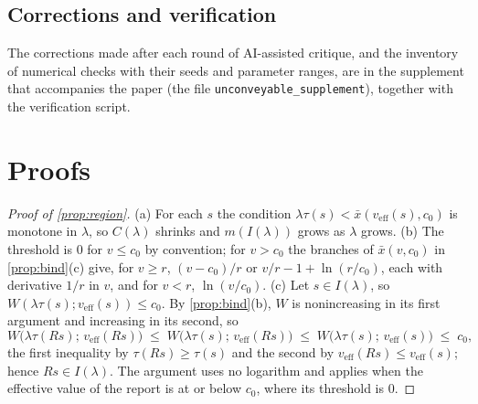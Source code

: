 \subsection{Corrections and verification}

The corrections made after each round of AI-assisted critique, and the inventory of numerical checks with their seeds and parameter ranges, are in the supplement that accompanies the paper (the file \texttt{unconveyable\_supplement}), together with the verification script.

\section{Proofs}\label{app:proofs}

\begin{proof}[Proof of \autoref{prop:region}]
(a) For each $s$ the condition $\lambda\tau(s) < \bar{x}(v_{\mathrm{eff}}(s), c_0)$ is monotone in $\lambda$, so $C(\lambda)$ shrinks and $m(I(\lambda))$ grows as $\lambda$ grows. (b) The threshold is $0$ for $v \le c_0$ by convention; for $v > c_0$ the branches of $\bar{x}(v, c_0)$ in \autoref{prop:bind}(c) give, for $v \ge r$, $(v - c_0)/r$ or $v/r - 1 + \ln(r/c_0)$, each with derivative $1/r$ in $v$, and for $v < r$, $\ln(v/c_0)$. (c) Let $s \in I(\lambda)$, so $W(\lambda\tau(s); v_{\mathrm{eff}}(s)) \le c_0$. By \autoref{prop:bind}(b), $W$ is nonincreasing in its first argument and increasing in its second, so
\[
W\big(\lambda\tau(Rs);\, v_{\mathrm{eff}}(Rs)\big) \;\le\; W\big(\lambda\tau(s);\, v_{\mathrm{eff}}(Rs)\big) \;\le\; W\big(\lambda\tau(s);\, v_{\mathrm{eff}}(s)\big) \;\le\; c_0,
\]
the first inequality by $\tau(Rs) \ge \tau(s)$ and the second by $v_{\mathrm{eff}}(Rs) \le v_{\mathrm{eff}}(s)$; hence $Rs \in I(\lambda)$. The argument uses no logarithm and applies when the effective value of the report is at or below $c_0$, where its threshold is $0$.
\end{proof}

